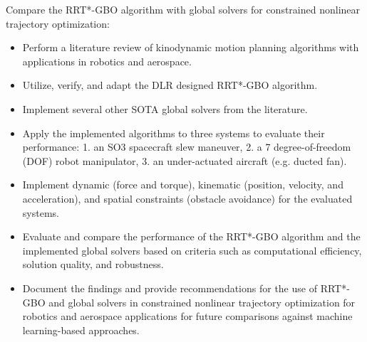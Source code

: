 Compare the \ac{RRT*-GBO} algorithm with global solvers for constrained nonlinear trajectory optimization:

\begin{itemize}
	\item Perform a literature review of kinodynamic motion planning algorithms with applications in robotics and aerospace.
	\item Utilize, verify, and adapt the DLR designed \ac{RRT*-GBO} algorithm.
	\item Implement several other \ac{SOTA} global solvers from the literature.
	\item Apply the implemented algorithms to three systems to evaluate their performance: 1. an \ac{SO3} spacecraft slew maneuver, 2. a 7 degree-of-freedom (\ac{DOF}) robot manipulator, 3. an under-actuated aircraft (e.g. ducted fan).
	\item Implement dynamic (force and torque), kinematic (position, velocity, and acceleration), and spatial constraints (obstacle avoidance) for the evaluated systems.
	\item Evaluate and compare the performance of the \ac{RRT*-GBO} algorithm and the implemented global solvers based on criteria such as computational efficiency, solution quality, and robustness.
	\item Document the findings and provide recommendations for the use of \ac{RRT*-GBO} and global solvers in constrained nonlinear trajectory optimization for robotics and aerospace applications for future comparisons against machine learning-based approaches.
\end{itemize}
